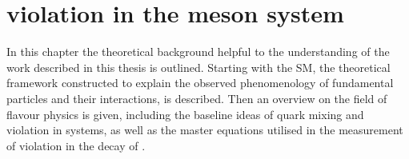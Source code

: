 
\chapter[
  head={\CP violation in the \Bd meson system},
  tocentry={\CPbfsf violation in the \Bdbfsf meson system}
]
{\CPbfsf violation in the \Bdbfsf meson system}
\label{ch:cpv_theory}

In this chapter the theoretical background helpful to the understanding of the
work described in this thesis is outlined. Starting with the \acl*{SM}, the
theoretical framework constructed to explain the observed phenomenology of
fundamental particles and their interactions, is described. Then an overview on
the field of flavour physics is given, including the baseline ideas of quark
mixing and \CP violation in \Bmeson systems, as well as the master equations
utilised in the measurement of \CP violation in the decay of \BdToJpsiKS.






